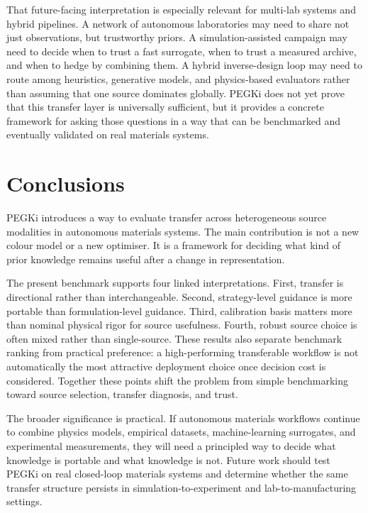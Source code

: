 \documentclass[twoside,twocolumn,9pt]{article}
\begin{document}
That future-facing interpretation is especially relevant for multi-lab systems and hybrid pipelines. A network of autonomous laboratories may need to share not just observations, but trustworthy priors.\cite{Yoshida2025NetworkedAutonomous} A simulation-assisted campaign may need to decide when to trust a fast surrogate, when to trust a measured archive, and when to hedge by combining them.\cite{Gongora2021SimulationTransfer} A hybrid inverse-design loop may need to route among heuristics, generative models, and physics-based evaluators rather than assuming that one source dominates globally.\cite{Collins2025FUSE} PEGKi does not yet prove that this transfer layer is universally sufficient, but it provides a concrete framework for asking those questions in a way that can be benchmarked and eventually validated on real materials systems.

\section*{Conclusions}

PEGKi introduces a way to evaluate transfer across heterogeneous source modalities in autonomous materials systems. The main contribution is not a new colour model or a new optimiser. It is a framework for deciding what kind of prior knowledge remains useful after a change in representation.

The present benchmark supports four linked interpretations. First, transfer is directional rather than interchangeable. Second, strategy-level guidance is more portable than formulation-level guidance. Third, calibration basis matters more than nominal physical rigor for source usefulness. Fourth, robust source choice is often mixed rather than single-source. These results also separate benchmark ranking from practical preference: a high-performing transferable workflow is not automatically the most attractive deployment choice once decision cost is considered. Together these points shift the problem from simple benchmarking toward source selection, transfer diagnosis, and trust.

The broader significance is practical. If autonomous materials workflows continue to combine physics models, empirical datasets, machine-learning surrogates, and experimental measurements, they will need a principled way to decide what knowledge is portable and what knowledge is not. Future work should test PEGKi on real closed-loop materials systems and determine whether the same transfer structure persists in simulation-to-experiment and lab-to-manufacturing settings.
\end{document}
